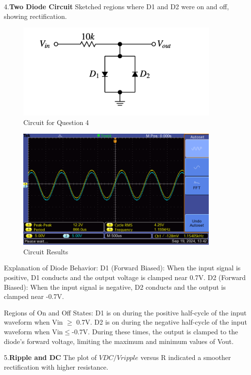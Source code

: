 \documentclass{article}
\begin{document}
4.\textbf{Two Diode Circuit} Sketched regions where D1 and D2 were on and off, showing rectification.
\begin{figure}[H]
    \centering
    \includegraphics[width=0.9\textwidth]{./img/other/Lab4_4.png}
    \caption{Circuit for Question 4}
    \label{fig:graph10}
\end{figure}

\begin{figure}[H]
    \centering
    \includegraphics[width=0.9\textwidth]{./img/Lab4_4.png}
    \caption{Circuit Results}
    \label{fig:graph11}
\end{figure}

Explanation of Diode Behavior:
D1 (Forward Biased): When the input signal is positive, D1 conducts and the output voltage is clamped near 0.7V.
D2 (Forward Biased): When the input signal is negative, D2 conducts and the output is clamped near -0.7V.

Regions of On and Off States:
D1 is on during the positive half-cycle of the input waveform when Vin $\ge$ 0.7V.
D2 is on during the negative half-cycle of the input waveform when Vin$\le$-0.7V.
During these times, the output is clamped to the diode's forward voltage, limiting the maximum and minimum values of 
Vout.

5.\textbf{Ripple and DC} The plot of \( VDC/Vripple \) versus R indicated a smoother rectification with higher resistance.
\end{document}
